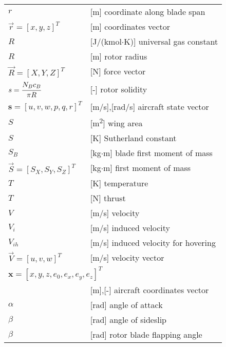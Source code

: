\begin{longtable}[l]{ l p{} }
  $r$                                          & [m] coordinate along blade span \\
  $\vec r=\left[ x, y, z \right]^T$            & [m] coordinates vector \\
  $R$                                          & [J/(kmol$\cdot$K)] universal gas constant \\
  $R$                                          & [m] rotor radius \\
  $\vec R=\left[ X, Y, Z \right]^T$            & [N] force vector \\
  $s=\cfrac{N_B c_B}{\pi R}$                   & [-] rotor solidity \\
  $\boldsymbol s=\left[ u,v,w,p,q,r \right]^T$ & [m/s],[rad/s] aircraft state vector \\
  $S$                                          & [m\textsuperscript{2}] wing area \\
  $S$                                          & [K] Sutherland constant \\
  $S_B$                                        & [kg$\cdot$m] blade first moment of mass \\
  $\vec S=\left[ S_X, S_Y, S_Z \right]^T$      & [kg$\cdot$m] first moment of mass \\
  $T$                                          & [K] temperature \\
  $T$                                          & [N] thrust \\
  $V$                                          & [m/s] velocity \\
  $V_i$                                        & [m/s] induced velocity \\
  $V_{ih}$                                     & [m/s] induced velocity for hovering \\
  $\vec V=\left[ u, v, w \right]^T$            & [m/s] velocity vector \\
  \multicolumn{2}{l}{$\boldsymbol x=\left[ x,y,z,e_0,e_x,e_y,e_z \right]^T$} \\
                                               & [m],[-] aircraft coordinates vector \\
  $\alpha$                                     & [rad] angle of attack \\
  $\beta$                                      & [rad] angle of sideslip \\
  $\beta$                                      & [rad] rotor blade flapping angle \\

\end{longtable}
